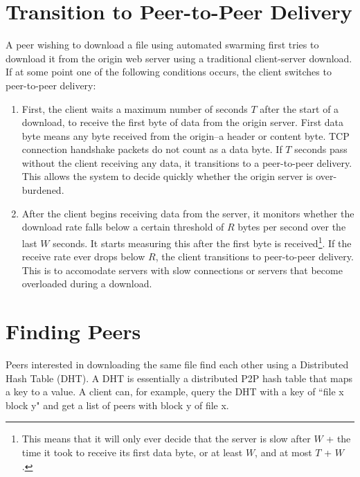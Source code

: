 \section{Transition to Peer-to-Peer Delivery}

A peer wishing to download a file using automated swarming first tries to download it from the origin web server using a traditional client-server download.  
If at some point one of the following conditions occurs, the client switches to peer-to-peer delivery:
\begin{enumerate}
\item First, the client waits a maximum number of seconds $T$ after the start of a download, to receive the first byte of data from the origin server.  
First data byte means any byte received from the origin--a header or content byte.  TCP connection handshake packets do not count as a data byte.
If $T$ seconds pass without the client receiving any data, it transitions to a peer-to-peer delivery.  This allows the system to decide quickly whether the origin server is over-burdened.   
\item After the client begins receiving data from the server, it monitors whether the download rate falls below a certain 
threshold of $R$ bytes per second over the last $W$ seconds.  It starts measuring this after the first byte is received\footnote{This means that it will
only ever decide that the server is slow after $W$ + the time it took to receive its first data byte, or at least $W$, and at most $T$ + $W$.}.  
If the receive rate ever drops below $R$, the client transitions to peer-to-peer delivery.  
This is to accomodate servers with slow connections or servers that become overloaded during a download.
\end{enumerate}

\section{Finding Peers}

Peers interested in downloading the same file find each other using a Distributed Hash Table (DHT).
A DHT is essentially a distributed P2P hash table that maps a key to a value.  A client can,
for example, query the DHT with a key of ``file x block y" and get a list of peers with block y
of file x.

